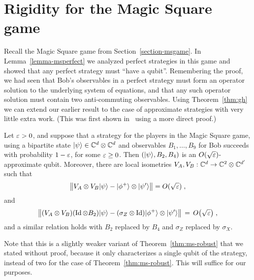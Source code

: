 \section{Rigidity for the Magic Square game}
\label{section-msrigid}

Recall the Magic Square game from Section~\ref{section-msgame}. In Lemma~\ref{lemma-msperfect} we analyzed perfect strategies in this game and showed that any perfect strategy must ``have a qubit''. Remembering the proof, we had seen that Bob's observables in a perfect strategy must form an operator solution to the underlying system of equations, and that any such operator solution must contain two anti-commuting observables. Using Theorem~\ref{thm:gh} we can extend our earlier result to the case of approximate strategies with very little extra work. (This was first shown in~\cite{wu2016device} using a more direct proof.)

\begin{theorem}
\label{thm:rigid-ms}
Let $\varepsilon>0$, and suppose that a strategy for the players  in the Magic Square game, using  a bipartite state $|\psi\rangle\in\mathbb{C}^d\otimes \mathbb{C}^d$ and observables $B_1,\ldots,B_9$ for Bob succeeds with probability $1-\varepsilon$, for some $\varepsilon \geq 0$. Then $(|\psi\rangle,B_2,B_4)$ is an $O(\sqrt{\varepsilon})$-approximate qubit. Moreover, there are local isometries $V_A,V_B:\mathbb{C}^d \to \mathbb{C}^2 \otimes \mathbb{C}^{d'}$ such that 
\begin{equation}
\label{eq:chsh-state}
\big\| V_A \otimes V_B |\psi\rangle - |\phi^+\rangle \otimes |\psi'\rangle \big\| = O(\sqrt{\varepsilon}) \;,
\end{equation}
and 
\begin{equation}
\label{eq:chsh-alice}
\big\|( V_A \otimes V_B)( \mathop{\rm Id}\nolimits \otimes B_2 )|\psi\rangle - (\sigma_Z \otimes \mathop{\rm Id}\nolimits) |\phi^+\rangle \otimes |\psi'\rangle \big\| \,=\, O\big(\sqrt{\varepsilon}\big)\;,
\end{equation}
and a similar relation holds with $B_2$ replaced by $B_4$ and $\sigma_Z$ replaced by $\sigma_X$. 
\end{theorem}

Note that this is a slightly weaker variant of Theorem~\ref{thm:ms-robust} that we stated without proof, because it only characterizes a single qubit of the strategy, instead of two for the case of Theorem~\ref{thm:ms-robust}. This will suffice for our purposes. 

